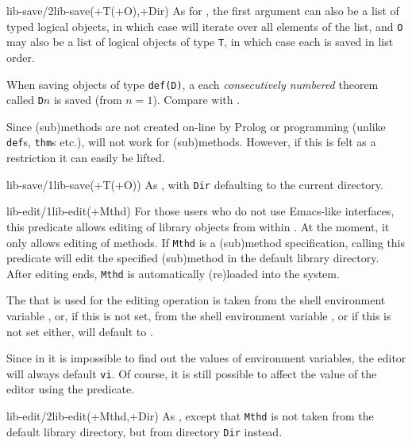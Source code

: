 \begin{predicate}{lib-save/2}{lib-save(+T(+O),+Dir)}
As for , the first argument can also be a list of typed
logical objects, in which case  will iterate over all
elements of the list, and {\tt O} may also be a list of logical
objects of type {\tt T}, in which case each is saved in list order.

When saving objects of type {\tt def(D)}, a each {\em consecutively
numbered\/} theorem called {\tt D$n$} is saved (from $n=1$).  Compare
with .

Since (sub)methods are not created on-line by Prolog or \oyster programming
(unlike {\tt def}s, {\tt thm}s etc.),  will not
work for (sub)methods. However, if this is felt as a restriction it
can easily be lifted. 
\end{predicate}

\begin{predicate}{lib-save/1}{lib-save(+T(+O))}%
As , with {\tt Dir} defaulting to the current directory. 
\end{predicate}

\begin{predicate}{lib-edit/1}{lib-edit(+Mthd)}%
For those users who do not use Emacs-like interfaces, this predicate
allows editing of library objects from within \clam. At the
moment, it only allows editing of methods. If
{\tt Mthd} is a (sub)method specification, calling this predicate will
edit the specified (sub)method in the default library directory. After
editing ends, {\tt Mthd} is automatically (re)loaded into the system.

The  that is used for the editing operation is taken from the
shell environment variable {\sc {}}, or, if this is not set, from
the shell environment variable {\sc {}}, or if this is not set
either, will default to {\tt {}}.

Since in  it is impossible to find out the values
of environment variables, the editor will always default {\tt vi}.  Of
course, it is still possible to affect the value of the editor using
the  predicate.
\end{predicate}

\begin{predicate}{lib-edit/2}{lib-edit(+Mthd,+Dir)}%
As , except that {\tt Mthd} is not taken from the
default library directory, but from directory {\tt Dir} instead.
\end{predicate}

